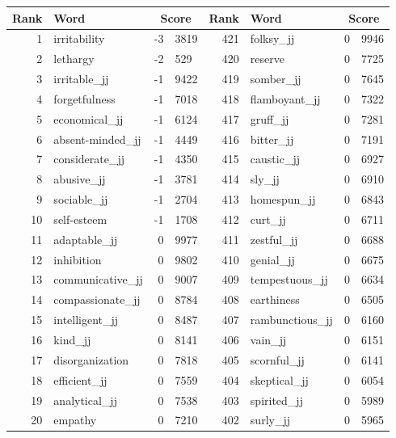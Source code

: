 \begin{table}[tbp]
    \begin{tabular}{| rlr@{.}l | rlr@{.}l |}
    \hline
    \textbf{Rank} & \textbf{Word} & \multicolumn{2}{c|}{\textbf{Score}} & \textbf{Rank} & \textbf{Word} & \multicolumn{2}{c|}{\textbf{Score}} \\
    \hline
    1 & irritability & -3 & 3819    &    421 & folksy\_jj & 0 & 9946 \\
    2 & lethargy & -2 & 529    &    420 & reserve & 0 & 7725 \\
    3 & irritable\_jj & -1 & 9422    &    419 & somber\_jj & 0 & 7645 \\
    4 & forgetfulness & -1 & 7018    &    418 & flamboyant\_jj & 0 & 7322 \\
    5 & economical\_jj & -1 & 6124    &    417 & gruff\_jj & 0 & 7281 \\
    6 & absent-minded\_jj & -1 & 4449    &    416 & bitter\_jj & 0 & 7191 \\
    7 & considerate\_jj & -1 & 4350    &    415 & caustic\_jj & 0 & 6927 \\
    8 & abusive\_jj & -1 & 3781    &    414 & sly\_jj & 0 & 6910 \\
    9 & sociable\_jj & -1 & 2704    &    413 & homespun\_jj & 0 & 6843 \\
    10 & self-esteem & -1 & 1708    &    412 & curt\_jj & 0 & 6711 \\
    11 & adaptable\_jj & 0 & 9977    &    411 & zestful\_jj & 0 & 6688 \\
    12 & inhibition & 0 & 9802    &    410 & genial\_jj & 0 & 6675 \\
    13 & communicative\_jj & 0 & 9007    &    409 & tempestuous\_jj & 0 & 6634 \\
    14 & compassionate\_jj & 0 & 8784    &    408 & earthiness & 0 & 6505 \\
    15 & intelligent\_jj & 0 & 8487    &    407 & rambunctious\_jj & 0 & 6160 \\
    16 & kind\_jj & 0 & 8141    &    406 & vain\_jj & 0 & 6151 \\
    17 & disorganization & 0 & 7818    &    405 & scornful\_jj & 0 & 6141 \\
    18 & efficient\_jj & 0 & 7559    &    404 & skeptical\_jj & 0 & 6054 \\
    19 & analytical\_jj & 0 & 7538    &    403 & spirited\_jj & 0 & 5989 \\
    20 & empathy & 0 & 7210    &    402 & surly\_jj & 0 & 5965 \\

\end{tabular}
\end{table}
